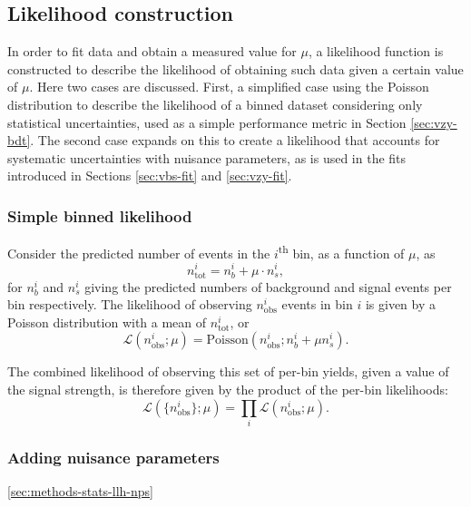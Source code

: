 \subsection{Likelihood construction}
\label{sec:methods-stats-llh}

In order to fit data and obtain a measured value for $\mu$, a likelihood
function is constructed to describe the likelihood of obtaining such data given
a certain value of $\mu$. Here two cases are discussed. First, a simplified
case using the Poisson distribution to describe the likelihood of a
binned dataset considering only statistical uncertainties, used as a simple
performance metric in Section \ref{sec:vzy-bdt}. The second case expands on this
to create a likelihood that accounts for systematic uncertainties with nuisance
parameters, as is used in the fits introduced in Sections \ref{sec:vbs-fit} and
\ref{sec:vzy-fit}.

\subsubsection{Simple binned likelihood}
\label{sec:methods-stats-llh-simple}

\newcommand\nobsi{\ensuremath{n_\text{obs}^i}\xspace}
Consider the predicted number of events in the $i$\textsuperscript{th} bin,
as a function of $\mu$, as
\begin{equation}
  n_\text{tot}^i = n_b^i + \mu\cdot n_s^i,
\end{equation}
for $n_b^i$ and $n_s^i$
giving the predicted numbers of background and signal events per bin
respectively. The likelihood of observing \nobsi events in bin $i$ is
given by a Poisson distribution with a mean of $n_\text{tot}^i$, or
\begin{equation*}
  \mathcal{L}(\nobsi;\mu) = \text{Poisson}(\nobsi; n_b^i + \mu n_s^i).
  \label{eqn:methods-stats-llh-perbin}
\end{equation*}

The combined likelihood of observing this set of per-bin yields, given a value
of the signal strength, is therefore given by the product of the per-bin
likelihoods:
\begin{equation}
  \mathcal{L}(\{\nobsi\};\mu) = \prod_i \mathcal{L}(\nobsi;\mu).
  \label{eqn:methods-stats-llh-total}
\end{equation}

\subsubsection{Adding nuisance parameters}
\ref{sec:methods-stats-llh-nps}

